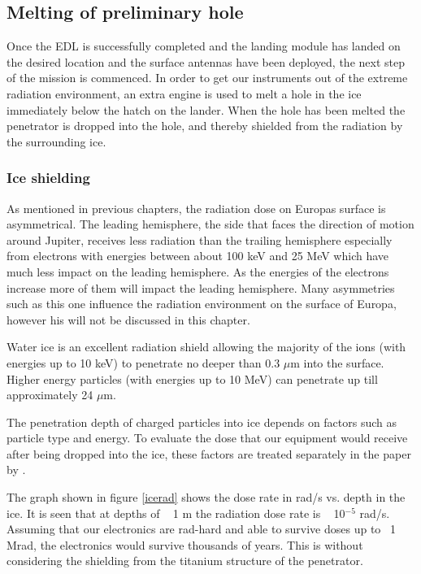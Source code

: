 \subsection{Melting of preliminary hole}

Once the EDL is successfully completed and the landing module has landed on the desired location and the surface antennas have been deployed, the next step of the mission is commenced. In order to get our instruments out of the extreme radiation environment, an extra engine is used to melt a hole in the ice immediately below the hatch on the lander. When the hole has been melted the penetrator is dropped into the hole, and thereby shielded from the radiation by the surrounding ice. 

\subsubsection{Ice shielding}

As mentioned in previous chapters, the radiation dose on Europas surface is asymmetrical. The leading hemisphere, the side that faces the direction of motion around Jupiter, receives less radiation than the trailing hemisphere especially from electrons with energies between about 100 keV and
25 MeV which have much less impact on the leading hemisphere. As the energies of the electrons increase more of them will impact the leading hemisphere. Many asymmetries such as this one influence the radiation environment on the surface of Europa, however his will not be discussed in this chapter. 


Water ice is an excellent radiation shield allowing the majority of the ions (with energies up to 10 keV) to penetrate no deeper than 0.3 $\mu$m into the surface. Higher energy particles (with energies up to 10 MeV) can penetrate up till approximately 24 $\mu$m. \cite{Paranicas_2009}

The penetration depth of charged particles into ice depends on factors such as particle type and energy. To evaluate the dose that our equipment would receive after being dropped into the ice, these factors are treated separately in the paper by  \cite{Paranicas_2009}.

The graph shown in figure \ref{icerad} shows the dose rate in rad/s vs. depth in the ice. 
It is seen that at depths of ~ 1 m the radiation dose rate is ~ 10$^{-5}$ rad/s. Assuming that our electronics are rad-hard and able to survive doses up to ~1 Mrad, the electronics would survive thousands of years. This is without considering the shielding from the titanium structure of the penetrator. 

